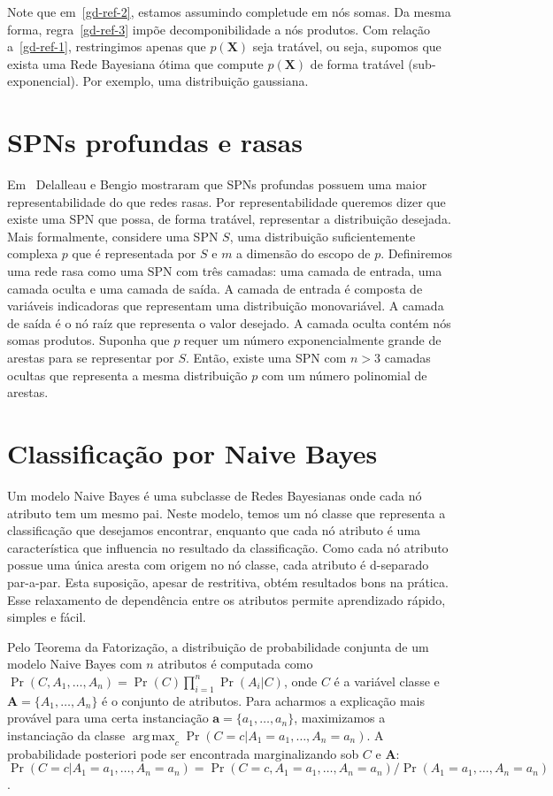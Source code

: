 \documentclass{amsart}
\DeclareMathOperator*{\argmax}{arg\,max}
\theoremstyle{plain}
\numberwithin{equation}{section}
\newcommand{\set}[1]{\mathbf{#1}}
\begin{document}
Note que em~\ref{gd-ref-2}, estamos assumindo completude em nós somas. Da mesma forma,
regra~\ref{gd-ref-3} impõe decomponibilidade a nós produtos. Com relação a~\ref{gd-ref-1},
restringimos apenas que $p(\set{X})$ seja tratável, ou seja, supomos que exista uma Rede Bayesiana
ótima que compute $p(\set{X})$ de forma tratável (sub-exponencial). Por exemplo, uma distribuição
gaussiana.

\section{SPNs profundas e rasas}

Em~\cite{shallow-vs-deep} Delalleau e Bengio mostraram que SPNs profundas possuem uma maior
representabilidade do que redes rasas. Por representabilidade queremos dizer que existe uma
SPN que possa, de forma tratável, representar a distribuição desejada. Mais formalmente, considere
uma SPN $S$, uma distribuição suficientemente complexa $p$ que é representada por $S$ e $m$ a
dimensão do escopo de $p$. Definiremos uma rede rasa como uma SPN com três camadas: uma camada de
entrada, uma camada oculta e uma camada de saída. A camada de entrada é composta de variáveis
indicadoras que representam uma distribuição monovariável. A camada de saída é o nó raíz que
representa o valor desejado. A camada oculta contém nós somas produtos. Suponha que $p$ requer um
número exponencialmente grande de arestas para se representar por $S$. Então, existe uma SPN com
$n>3$ camadas ocultas que representa a mesma distribuição $p$ com um número polinomial de arestas.

\section{Classificação por Naive Bayes}

Um modelo Naive Bayes é uma subclasse de Redes Bayesianas onde cada nó atributo tem um mesmo pai.
Neste modelo, temos um nó classe que representa a classificação que desejamos encontrar, enquanto
que cada nó atributo é uma característica que influencia no resultado da classificação. Como cada
nó atributo possue uma única aresta com origem no nó classe, cada atributo é d-separado par-a-par.
Esta suposição, apesar de restritiva, obtém resultados bons na prática. Esse relaxamento de
dependência entre os atributos permite aprendizado rápido, simples e fácil.

Pelo Teorema da Fatorização, a distribuição de probabilidade conjunta de um modelo Naive Bayes com
$n$ atributos é computada como $\Pr(C,A_1,\ldots,A_n)=\Pr(C)\prod_{i=1}^n \Pr(A_i|C)$, onde $C$ é
a variável classe e $\set{A}=\{A_1,\ldots,A_n\}$ é o conjunto de atributos. Para acharmos a
explicação mais provável para uma certa instanciação $\set{a}=\{a_1,\ldots,a_n\}$, maximizamos a
instanciação da classe $\argmax_c \Pr(C=c|A_1=a_1,\ldots,A_n=a_n)$. A probabilidade posteriori
pode ser encontrada marginalizando sob $C$ e $\set{A}$: $\Pr(C=c|A_1=a_1,\ldots,A_n=a_n)=\Pr(C=c,
A_1=a_1,\ldots,A_n=a_n)/\Pr(A_1=a_1,\ldots,A_n=a_n)$.
\end{document}
